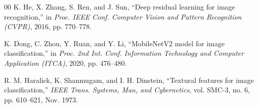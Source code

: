 \begin{thebibliography}{00}
K. He, X. Zhang, S. Ren, and J. Sun, ``Deep residual learning for image recognition,'' in \textit{Proc. IEEE Conf. Computer Vision and Pattern Recognition (CVPR)}, 2016, pp. 770--778.

K. Dong, C. Zhou, Y. Ruan, and Y. Li, ``MobileNetV2 model for image classification,'' in \textit{Proc. 2nd Int. Conf. Information Technology and Computer Application (ITCA)}, 2020, pp. 476--480.

R. M. Haralick, K. Shanmugam, and I. H. Dinstein, ``Textural features for image classification,'' \textit{IEEE Trans. Systems, Man, and Cybernetics}, vol. SMC-3, no. 6, pp. 610--621, Nov. 1973.
\end{thebibliography}